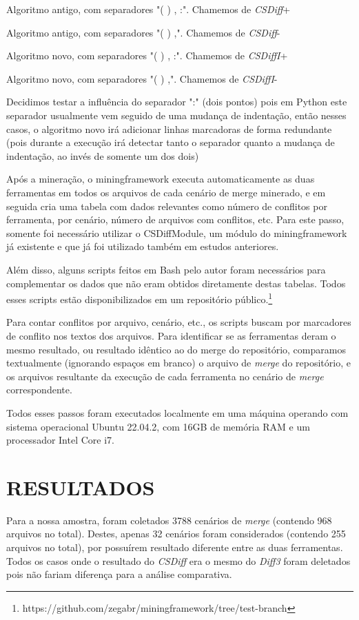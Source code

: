 \begin{compactenum}[(1)]
	\item Algoritmo antigo, com separadores "( ) , :". Chamemos de \emph{CSDiff}+
	\item Algoritmo antigo, com separadores "( ) ,". Chamemos de \emph{CSDiff}-
	\item Algoritmo novo, com separadores "( ) , :". Chamemos de \emph{CSDiffI}+
	\item Algoritmo novo, com separadores "( ) ,". Chamemos de \emph{CSDiffI}-
\end{compactenum}

Decidimos testar a influência do separador ":" (dois pontos) pois em Python este separador usualmente vem seguido de uma
mudança de indentação, então nesses casos, o algoritmo novo irá adicionar linhas marcadoras de forma redundante (pois
durante a execução irá detectar tanto o separador quanto a mudança de indentação, ao invés de somente um dos dois)

Após a mineração, o miningframework executa automaticamente as duas ferramentas em todos os arquivos de cada cenário de merge
minerado, e em seguida cria uma tabela com dados relevantes como número de conflitos por
ferramenta, por cenário, número de arquivos com conflitos, etc. Para este passo, somente foi necessário utilizar
o CSDiffModule, um módulo do miningframework já existente e que já foi utilizado também em estudos anteriores.

Além disso, alguns scripts feitos em Bash pelo autor foram necessários para complementar os dados que não eram obtidos
diretamente destas tabelas. Todos esses scripts estão disponibilizados em um repositório público.\footnote{https://github.com/zegabr/miningframework/tree/test-branch} %

Para contar conflitos por arquivo,
cenário, etc., os scripts buscam por marcadores
de conflito nos textos dos arquivos. Para identificar se as ferramentas deram o mesmo resultado,
ou resultado idêntico ao do merge
do repositório, comparamos textualmente (ignorando espaços em
branco) o arquivo de \emph{merge} do repositório, e os arquivos resultante da execução de cada
ferramenta no cenário de \emph{merge} correspondente.

Todos esses passos foram executados localmente em uma máquina operando com sistema operacional Ubuntu 22.04.2,
com 16GB de memória
RAM e um processador Intel Core i7.

\section{RESULTADOS}
Para a nossa amostra, foram coletados 3788 cenários de \emph{merge} (contendo 968 arquivos
no total). Destes, apenas 32 cenários foram considerados (contendo 255 arquivos no total), por possuírem resultado
diferente entre as duas ferramentas. Todos os casos onde o resultado do \emph{CSDiff} era o mesmo do \emph{Diff3}
foram deletados pois não fariam
diferença para a análise comparativa.

